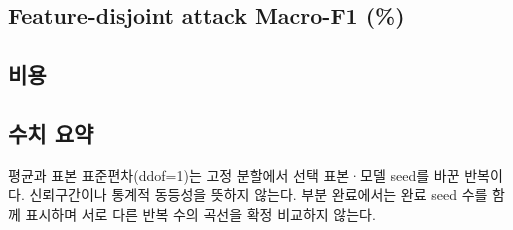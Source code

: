 \subsection{Feature-disjoint attack Macro-F1 (\%)}


\subsection{비용}


\subsection{수치 요약}
평균과 표본 표준편차(ddof=\allowbreak{}1)는 고정 분할에서 선택 표본·모델 seed를 바꾼 반복이다. 신뢰구간이나 통계적 동등성을 뜻하지 않는다. 부분 완료에서는 완료 seed 수를 함께 표시하며 서로 다른 반복 수의 곡선을 확정 비교하지 않는다.

